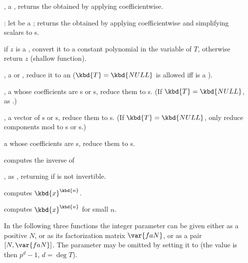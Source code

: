 ,  a , returns the
 obtained by applying  coefficientwise.

: let  be a ;
returns the  obtained by applying 
coefficientwise and simplifying scalars to s.

if $z$ is a , convert it to a constant polynomial in the variable of
$T$, otherwise return $z$ (shallow function).

,  a  or ,
reduce it to an  ($\kbd{T} = \kbd{NULL}$ is allowed iff  is a
).

,  a 
whose coefficients are s or s, reduce them to s. (If
$\kbd{T} = \kbd{NULL}$, as .)

,  a vector of s or
s, reduce them to s. (If $\kbd{T} = \kbd{NULL}$, only
reduce components mod  to s or s.)

  a 
whose coefficients are s, reduce them to s.







 computes the inverse of 

, as , returning
 if  is not invertible.

 computes $\kbd{x}^\kbd{n}$.

 computes $\kbd{x}^\kbd{n}$
for small $n$.

In the following three functions the integer parameter  can be given
either as a positive  $N$, or as its factorization matrix $\var{faN}$,
or as a pair $[N,\var{faN}]$. The parameter may be omitted by setting it to
 (the value is then $p^d-1$, $d = \deg T$).

